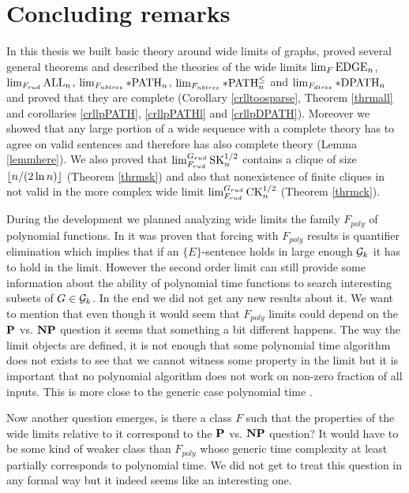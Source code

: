 \chapter*{Concluding remarks}

In this thesis we built basic theory around wide limits of graphs, proved several general theorems and described the theories of the wide limits $\lim_F\EDGE_n$, $\lim_{F_{rud}}\ALL_n$, $\lim_{F_{nbtree}}\pPATH_n$, $\lim_{F_{nbtree}}\pPATHl_n$ and $\lim_{F_{dtree}}\pDPATH_n$ and proved that they are complete (Corollary \ref{crlltoosparse}, Theorem \ref{thrmall} and corollaries \ref{crllpPATH}, \ref{crllpPATHl} and \ref{crllpDPATH}). Moreover we showed that any large portion of a wide sequence with a complete theory has to agree on valid sentences and therefore has also complete theory (Lemma \ref{lemmhere}). We also proved that $\lim_{F_{rud}}^{G_{rud}}\SK_n^{1/2}$ contains a clique of size $\floor{n/(2\ln n)}$ (Theorem \ref{thrmsk}) and also that nonexistence of finite cliques in not valid in the more complex wide limit $\lim_{F_{rud}}^{G_{rud}}\CK_n^{1/2}$ (Theorem \ref{thrmck}).


During the development we planned analyzing wide limits the family $F_{poly}$ of polynomial functions. In \cite{krajicek2010forcing} it was proven that forcing with $F_{poly}$ results is quantifier elimination which implies that if an $\{E\}$-sentence holds in large enough $\G_k$ it has to hold in the limit. However the second order limit can still provide some information about the ability of polynomial time functions to search interesting subsets of $G\in\G_k$. In the end we did not get any new results about it. We want to mention that even though it would seem that $F_{poly}$ limits could depend on the $\P$ vs. $\NP$ question it seems that something a bit different happens. The way the limit objects are defined, it is not enough that some polynomial time algorithm does not exists to see that we cannot witness some property in the limit but it is important that no polynomial algorithm does not work on non-zero fraction of all inputs. This is more close to the generic case polynomial time \cite{gilman2007report}.

Now another question emerges, is there a class $F$ such that the properties of the wide limits relative to it correspond to the $\P$ vs. $\NP$ question? It would have to be some kind of weaker class than $F_{poly}$ whose generic time complexity at least partially corresponds to polynomial time. We did not get to treat this question in any formal way but it indeed seems like an interesting one.

